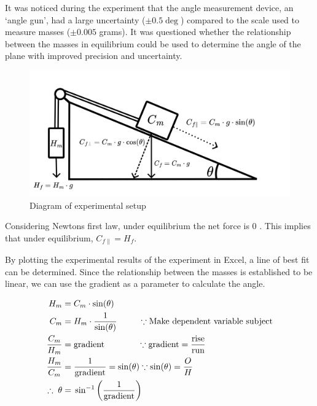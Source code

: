\documentclass[11pt,a4paper]{article}
\begin{document}
It was noticed during the experiment that the angle measurement device, an `angle gun', had a large uncertainty ($\pm0.5\deg$) compared to the scale used to measure masses ($\pm0.005$ grams). It was questioned whether the relationship between the masses in equilibrium could be used to determine the angle of the plane with improved precision and uncertainty. 
\newline
\begin{figure}[h]
	\centering
	\includegraphics[width=0.5\paperwidth]{./Diagrams/set_upV2.png}
	\caption{Diagram of experimental setup}
\end{figure}
\newline
Considering Newtons first law, under equilibrium the net force is 0 \cite{encyclopediabritannica_2023_newtons}. This implies that under equilibrium,  $C_{f\parallel}=H_f$.

By plotting the experimental results of the experiment in Excel, a line of best fit can be determined. Since the relationship between the masses is established to be linear, we can use the gradient as a parameter to calculate the angle. 

\begin{center}
	\begin{align*}
	H_m= &\;C_m\cdot{\sin(\theta)} \\
	C_m= &\;H_m\cdot\frac{1}{{\sin(\theta)}}\;\;\;\; \;\;\;\;\;\because \textrm{Make dependent variable subject} \\
	\frac{C_m}{H_m}=&\;\textrm{gradient}	\;\;\;\;\;\;\;\;\;\;\;\;\;\;\because \textrm{gradient}=\frac{\textrm{rise}}{\textrm{run}}\\
\linebreak
	\frac{H_m}{C_m}=&\;\frac{1}{\mathrm{gradient}}=\sin(\theta) \because \sin(\theta)=\frac{O}{H}\\
	\therefore  \;\theta=&\;\sin^{-1}\left(\frac{1}{\textrm{gradient}}\right)
	\end{align*}
\end{center}
\end{document}
